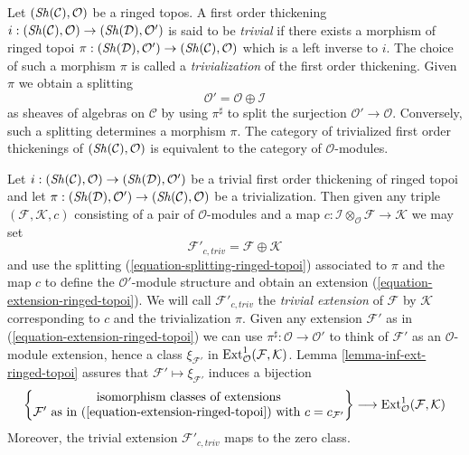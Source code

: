 \begin{remark}
\label{remark-trivial-thickening-ringed-topoi}
Let $(\mathop{\mathit{Sh}}\nolimits(\mathcal{C}), \mathcal{O})$ be a ringed topos. A first order
thickening $i : (\mathop{\mathit{Sh}}\nolimits(\mathcal{C}), \mathcal{O}) \to
(\mathop{\mathit{Sh}}\nolimits(\mathcal{D}), \mathcal{O}')$ is said
to be {\it trivial} if there exists a morphism of ringed topoi
$\pi : (\mathop{\mathit{Sh}}\nolimits(\mathcal{D}), \mathcal{O}') \to (\mathop{\mathit{Sh}}\nolimits(\mathcal{C}), \mathcal{O})$
which is a left inverse to $i$. The choice of such a morphism
$\pi$ is called a {\it trivialization} of the first order thickening.
Given $\pi$ we obtain a splitting
\begin{equation}
\label{equation-splitting-ringed-topoi}
\mathcal{O}' = \mathcal{O} \oplus \mathcal{I}
\end{equation}
as sheaves of algebras on $\mathcal{C}$ by using $\pi^\sharp$
to split the surjection $\mathcal{O}' \to \mathcal{O}$.
Conversely, such a splitting determines
a morphism $\pi$. The category of trivialized first order thickenings of
$(\mathop{\mathit{Sh}}\nolimits(\mathcal{C}), \mathcal{O})$ is equivalent to the category of 
$\mathcal{O}$-modules.
\end{remark}

\begin{remark}
\label{remark-trivial-extension-ringed-topoi}
Let $i : (\mathop{\mathit{Sh}}\nolimits(\mathcal{C}), \mathcal{O}) \to (\mathop{\mathit{Sh}}\nolimits(\mathcal{D}), \mathcal{O}')$
be a trivial first order thickening of ringed topoi
and let $\pi : (\mathop{\mathit{Sh}}\nolimits(\mathcal{D}), \mathcal{O}') \to
(\mathop{\mathit{Sh}}\nolimits(\mathcal{C}), \mathcal{O})$ be a trivialization. Then given any triple
$(\mathcal{F}, \mathcal{K}, c)$ consisting of a pair of
$\mathcal{O}$-modules and a map
$c : \mathcal{I} \otimes_\mathcal{O} \mathcal{F} \to \mathcal{K}$
we may set
$$
\mathcal{F}'_{c, triv} = \mathcal{F} \oplus \mathcal{K}
$$
and use the splitting (\ref{equation-splitting-ringed-topoi})
associated to $\pi$ and the map $c$ to define the $\mathcal{O}'$-module
structure and obtain an extension (\ref{equation-extension-ringed-topoi}).
We will call $\mathcal{F}'_{c, triv}$ the {\it trivial extension} of
$\mathcal{F}$ by $\mathcal{K}$ corresponding
to $c$ and the trivialization $\pi$. Given any extension
$\mathcal{F}'$ as in (\ref{equation-extension-ringed-topoi}) we can use
$\pi^\sharp : \mathcal{O} \to \mathcal{O}'$ to think of $\mathcal{F}'$
as an $\mathcal{O}$-module extension, hence a class $\xi_{\mathcal{F}'}$
in $\mathop{\mathrm{Ext}}\nolimits^1_\mathcal{O}(\mathcal{F}, \mathcal{K})$.
Lemma \ref{lemma-inf-ext-ringed-topoi} assures that
$\mathcal{F}' \mapsto \xi_{\mathcal{F}'}$
induces a bijection
$$
\left\{
\begin{matrix}
\text{isomorphism classes of extensions}\\
\mathcal{F}'\text{ as in (\ref{equation-extension-ringed-topoi}) with }
c = c_{\mathcal{F}'}
\end{matrix}
\right\}
\longrightarrow
\mathop{\mathrm{Ext}}\nolimits^1_\mathcal{O}(\mathcal{F}, \mathcal{K})
$$
Moreover, the trivial extension $\mathcal{F}'_{c, triv}$ maps to the zero class.
\end{remark}

